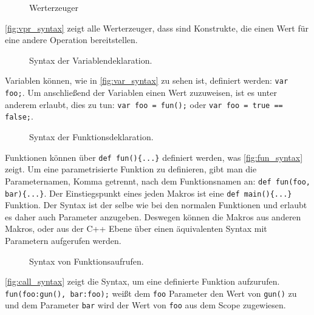     \begin{figure}[H]
      \centering
      \caption{Werterzeuger}
      \label{fig:vpr_syntax}
    \end{figure}
    \autoref{fig:vpr_syntax} zeigt alle Werterzeuger, dass sind Konstrukte, die einen Wert für eine andere Operation bereitstellen.

    \begin{figure}[H]
      \centering
      \caption{Syntax der Variablendeklaration.}
      \label{fig:var_syntax}
    \end{figure}
    Variablen können, wie in \autoref{fig:var_syntax} zu sehen ist, definiert werden: \lstinline[style=MyMacroStyle]$var foo;$. Um anschließend der Variablen einen Wert zuzuweisen, ist es unter anderem erlaubt, dies zu tun: \lstinline[style=MyMacroStyle]$var foo = fun();$ oder \lstinline[style=MyMacroStyle]$var foo = true == false;$.

    \begin{figure}[H]
      \centering
      \caption{Syntax der Funktionsdeklaration.}
      \label{fig:fun_syntax}
    \end{figure}
    Funktionen können über \lstinline[style=MyMacroStyle]$def fun(){...}$ definiert werden, was \autoref{fig:fun_syntax} zeigt. Um eine parametrisierte Funktion zu definieren, gibt man die Parameternamen, Komma getrennt, nach dem Funktionsnamen an: \lstinline[style=MyMacroStyle]$def fun(foo, bar){...}$.
    Der Einstiegspunkt eines jeden Makros ist eine \lstinline[style=MyMacroStyle]$def main(){...}$ Funktion. Der Syntax ist der selbe wie bei den normalen Funktionen und erlaubt es daher auch Parameter anzugeben. Deswegen können die Makros aus anderen Makros, oder aus der C++ Ebene über einen äquivalenten Syntax mit Parametern aufgerufen werden.

    \begin{figure}[H]
      \centering
      \caption{Syntax von Funktionsaufrufen.}
      \label{fig:call_syntax}
    \end{figure}
    \autoref{fig:call_syntax} zeigt die Syntax, um eine definierte Funktion aufzurufen. \lstinline[style=MyMacroStyle]$fun(foo:gun(), bar:foo);$ weißt dem \lstinline[style=MyMacroStyle]$foo$ Parameter den Wert von \lstinline[style=MyMacroStyle]$gun()$ zu und dem Parameter \lstinline[style=MyMacroStyle]$bar$ wird der Wert von \lstinline[style=MyMacroStyle]$foo$ aus dem Scope zugewiesen.

